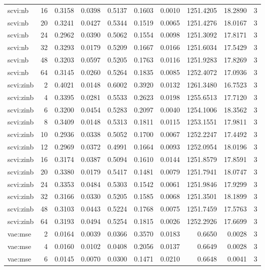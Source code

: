 \begin{tabular}{lrrrrrrrrr}
scvi:nb & 16 & 0.3158 & 0.0398 & 0.5137 & 0.1603 & 0.0010 & 1251.4205 & 18.2890 & 3 \\
scvi:nb & 20 & 0.3241 & 0.0427 & 0.5344 & 0.1519 & 0.0065 & 1251.4276 & 18.0167 & 3 \\
scvi:nb & 24 & 0.2962 & 0.0390 & 0.5062 & 0.1554 & 0.0098 & 1251.3092 & 17.8171 & 3 \\
scvi:nb & 32 & 0.3293 & 0.0179 & 0.5209 & 0.1667 & 0.0166 & 1251.6034 & 17.5429 & 3 \\
scvi:nb & 48 & 0.3203 & 0.0597 & 0.5205 & 0.1763 & 0.0116 & 1251.9283 & 17.8269 & 3 \\
scvi:nb & 64 & 0.3145 & 0.0260 & 0.5264 & 0.1835 & 0.0085 & 1252.4072 & 17.0936 & 3 \\
scvi:zinb & 2 & 0.4021 & 0.0148 & 0.6002 & 0.3920 & 0.0132 & 1261.3480 & 16.7523 & 3 \\
scvi:zinb & 4 & 0.3395 & 0.0281 & 0.5533 & 0.2623 & 0.0198 & 1255.6513 & 17.7120 & 3 \\
scvi:zinb & 6 & 0.3200 & 0.0454 & 0.5283 & 0.2097 & 0.0040 & 1254.1006 & 18.3562 & 3 \\
scvi:zinb & 8 & 0.3409 & 0.0148 & 0.5313 & 0.1811 & 0.0115 & 1253.1551 & 17.9811 & 3 \\
scvi:zinb & 10 & 0.2936 & 0.0338 & 0.5052 & 0.1700 & 0.0067 & 1252.2247 & 17.4492 & 3 \\
scvi:zinb & 12 & 0.2969 & 0.0372 & 0.4991 & 0.1664 & 0.0093 & 1252.0954 & 18.0196 & 3 \\
scvi:zinb & 16 & 0.3174 & 0.0387 & 0.5094 & 0.1610 & 0.0144 & 1251.8579 & 17.8591 & 3 \\
scvi:zinb & 20 & 0.3380 & 0.0179 & 0.5417 & 0.1481 & 0.0079 & 1251.7941 & 18.0747 & 3 \\
scvi:zinb & 24 & 0.3353 & 0.0484 & 0.5303 & 0.1542 & 0.0061 & 1251.9846 & 17.9299 & 3 \\
scvi:zinb & 32 & 0.3166 & 0.0330 & 0.5205 & 0.1585 & 0.0068 & 1251.3501 & 18.1899 & 3 \\
scvi:zinb & 48 & 0.3103 & 0.0443 & 0.5224 & 0.1768 & 0.0075 & 1251.7459 & 17.5763 & 3 \\
scvi:zinb & 64 & 0.3193 & 0.0494 & 0.5254 & 0.1815 & 0.0026 & 1252.2926 & 17.6699 & 3 \\
vae:mse & 2 & 0.0164 & 0.0039 & 0.0366 & 0.3570 & 0.0183 & 0.6650 & 0.0028 & 3 \\
vae:mse & 4 & 0.0160 & 0.0102 & 0.0408 & 0.2056 & 0.0137 & 0.6649 & 0.0028 & 3 \\
vae:mse & 6 & 0.0145 & 0.0070 & 0.0300 & 0.1471 & 0.0210 & 0.6648 & 0.0041 & 3 \\

\end{tabular}
